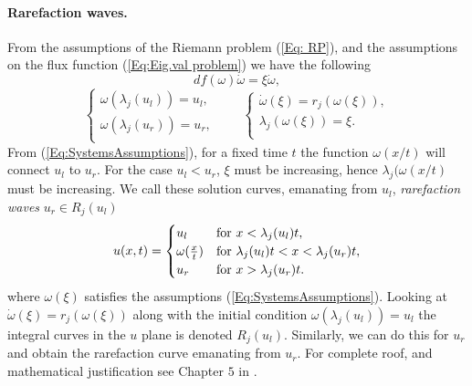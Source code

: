 \documentclass[10pt]{article}
\numberwithin{equation}{section}
\begin{document}
\paragraph{Rarefaction waves.}
From the assumptions of the Riemann problem (\ref{Eq: RP}), and the assumptions on the flux function (\ref{Eq:Eig.val problem}) we have the following \begin{equation*}
     df( \omega) \dot \omega =  \xi \dot \omega,
\end{equation*} \begin{equation}
    \begin{cases}
    \omega( \lambda_j( u_l) ) = u_l, \\
    \omega( \lambda_j( u_r) ) = u_r, \\
    \end{cases}
    \quad \quad
    \begin{cases}
    \dot \omega( \xi ) = r_j( \omega(\xi)), \\
    \lambda_j (\omega(\xi)) = \xi. \\
    \end{cases}
    \label{Eq:SystemsAssumptions}
\end{equation}
From (\ref{Eq:SystemsAssumptions}), for a fixed time $t$ the function $\omega(x/t)$ will connect $u_l$ to $u_r$. For the case $u_l < u_r$, $\xi$ must be increasing, hence $\lambda_j( \omega(x/t)$ must be increasing. We call these solution curves, emanating from $u_l$, \textit{rarefaction waves} $u_r \in R_j(u_l)$
\begin{equation}
     u(x,t) = \begin{cases} u_l & \text{for $x < \lambda_j(u_l)t$,}\\
                            \omega(\frac{x}{t}) & \text{for $ \lambda_j(u_l)t$} < x <  \lambda_j(u_r)t,\\ 
                            u_r & \text{for $x >  \lambda_j(u_r)t$.} 
     \end{cases}
     \label{Eq:SystemRarefactionSol}
 \end{equation}
where $\omega(\xi)$ satisfies the assumptions (\ref{Eq:SystemsAssumptions}). Looking at $\dot \omega( \xi ) = r_j( \omega(\xi))$ along with the initial condition $\omega( \lambda_j( u_l) ) = u_l$ the integral curves in the $u$ plane is denoted $R_j(u_l)$.  Similarly, we can do this for $u_r$ and obtain the rarefaction curve emanating from $u_r$. For complete roof, and mathematical justification see Chapter $5$ in \cite{HoldenH.Helge2015Ftfh}. 
\end{document}
